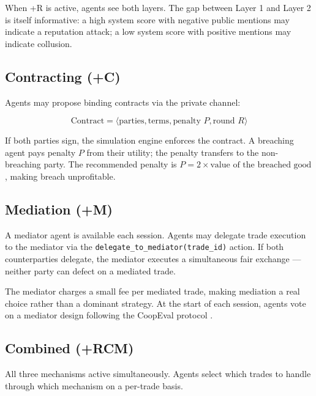 \documentclass[12pt, a4paper]{article}
\newcommand{\placeholder}[1]{%
  \begin{figure}[H]
    \centering
    \fbox{%
      \begin{minipage}{0.85\textwidth}
        \centering\vspace{1.5cm}
        \textcolor{gray}{\textit{[PLACEHOLDER: #1]}}
        \vspace{1.5cm}
      \end{minipage}%
    }
  \end{figure}%
}
\begin{document}
When +R is active, agents see both layers. The gap between Layer 1 and Layer 2 is itself informative: a high system score with negative public mentions may indicate a reputation attack; a low system score with positive mentions may indicate collusion.

\subsection{Contracting (+C)}

Agents may propose binding contracts via the private channel:

\[
\text{Contract} = \langle \text{parties}, \text{terms}, \text{penalty } P, \text{round } R \rangle
\]

If both parties sign, the simulation engine enforces the contract. A breaching agent pays penalty $P$ from their utility; the penalty transfers to the non-breaching party. The recommended penalty is $P = 2 \times \text{value of the breached good}$, making breach unprofitable.

\subsection{Mediation (+M)}

A mediator agent is available each session. Agents may delegate trade execution to the mediator via the \texttt{delegate\_to\_mediator(trade\_id)} action. If both counterparties delegate, the mediator executes a simultaneous fair exchange — neither party can defect on a mediated trade.

The mediator charges a small fee per mediated trade, making mediation a real choice rather than a dominant strategy. At the start of each session, agents vote on a mediator design following the CoopEval protocol \citep{coopeval}.

\subsection{Combined (+RCM)}

All three mechanisms active simultaneously. Agents select which trades to handle through which mechanism on a per-trade basis.

\placeholder{Table: Mechanism comparison table. Suggested: rows = Baseline / +R / +C / +M / +RCM, columns = Enforcement type / Information effect / Cost to agents / Predicted defection reduction. Fill with qualitative entries from the literature.}
\end{document}
